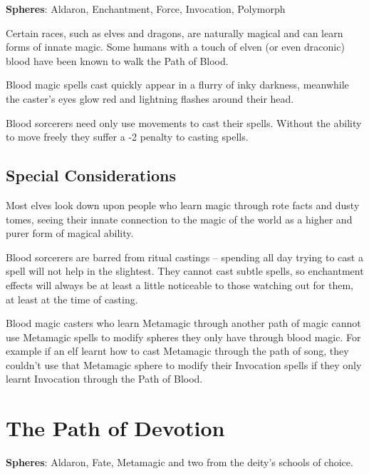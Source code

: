 \textbf{Spheres}: Aldaron, Enchantment, Force, Invocation, Polymorph

\begin{multicols}{2}

\noindent Certain races, such as elves and dragons, are naturally magical and can learn forms of innate magic. Some humans with a touch of elven (or even draconic) blood have been known to walk the Path of Blood.

Blood magic spells cast quickly appear in a flurry of inky darkness, meanwhile the caster's eyes glow red and lightning flashes around their head.

Blood sorcerers need only use movements to cast their spells. Without the ability to move freely they suffer a -2 penalty to casting spells.

\subsection{Special Considerations}

Most elves look down upon people who learn magic through rote facts and dusty tomes, seeing their innate connection to the magic of the world as a higher and purer form of magical ability.

Blood sorcerers are barred from ritual castings -- spending all day trying to cast a spell will not help in the slightest. They cannot cast subtle spells, so enchantment effects will always be at least a little noticeable to those watching out for them, at least at the time of casting.

Blood magic casters who learn Metamagic through another path of magic cannot use Metamagic spells to modify spheres they only have through blood magic.
For example if an elf learnt how to cast Metamagic through the path of song, they couldn't use that Metamagic sphere to modify their Invocation spells if they only learnt Invocation through the Path of Blood.

\end{multicols}

\section{The Path of Devotion}

\textbf{Spheres}: Aldaron, Fate, Metamagic and two from the deity's schools of choice.

